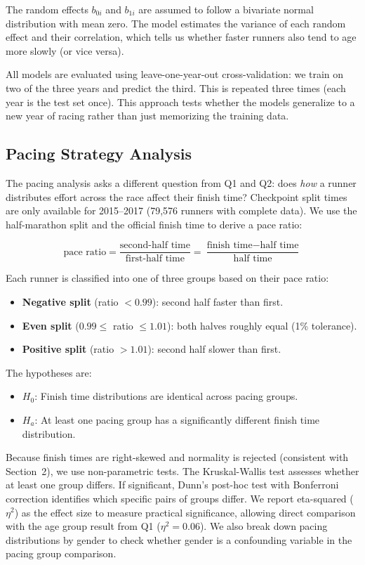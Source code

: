 \documentclass[conference]{IEEEtran}
\begin{document}
The random effects $b_{0i}$ and $b_{1i}$ are assumed to follow a bivariate normal distribution with mean zero. The model estimates the variance of each random effect and their correlation, which tells us whether faster runners also tend to age more slowly (or vice versa).

All models are evaluated using leave-one-year-out cross-validation: we train on two of the three years and predict the third. This is repeated three times (each year is the test set once). This approach tests whether the models generalize to a new year of racing rather than just memorizing the training data.

\subsection{Pacing Strategy Analysis}

The pacing analysis asks a different question from Q1 and Q2: does \emph{how} a runner distributes effort across the race affect their finish time? Checkpoint split times are only available for 2015--2017 (79,576 runners with complete data). We use the half-marathon split and the official finish time to derive a pace ratio:

\[
\text{pace ratio} = \frac{\text{second-half time}}{\text{first-half time}} = \frac{\text{finish time} - \text{half time}}{\text{half time}}
\]

Each runner is classified into one of three groups based on their pace ratio:

\begin{itemize}
    \item \textbf{Negative split} (ratio $< 0.99$): second half faster than first.
    \item \textbf{Even split} ($0.99 \leq$ ratio $\leq 1.01$): both halves roughly equal (1\% tolerance).
    \item \textbf{Positive split} (ratio $> 1.01$): second half slower than first.
\end{itemize}

The hypotheses are:
\begin{itemize}
    \item $H_0$: Finish time distributions are identical across pacing groups.
    \item $H_a$: At least one pacing group has a significantly different finish time distribution.
\end{itemize}

Because finish times are right-skewed and normality is rejected (consistent with Section~2), we use non-parametric tests. The Kruskal-Wallis test assesses whether at least one group differs. If significant, Dunn's post-hoc test with Bonferroni correction identifies which specific pairs of groups differ. We report eta-squared ($\eta^2$) as the effect size to measure practical significance, allowing direct comparison with the age group result from Q1 ($\eta^2 = 0.06$). We also break down pacing distributions by gender to check whether gender is a confounding variable in the pacing group comparison.
\end{document}
